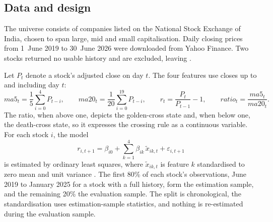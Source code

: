 \documentclass[11pt]{article}
\begin{document}
\subsection{Data and design}

The universe consists of \NUniverse{} companies listed on the National Stock
Exchange of India, chosen to span large, mid and small capitalisation. Daily closing
prices from 1~June 2019 to 30~June 2026 were downloaded from Yahoo Finance. Two
stocks returned no usable history and are excluded, leaving \NStocks.

Let $P_t$ denote a stock's adjusted close on day $t$. The four features use closes
up to and including day $t$:
\begin{equation}\label{eq:features}
  \mathit{ma5}_t = \frac{1}{5}\sum_{i=0}^{4} P_{t-i}, \qquad
  \mathit{ma20}_t = \frac{1}{20}\sum_{i=0}^{19} P_{t-i}, \qquad
  r_t = \frac{P_t}{P_{t-1}} - 1, \qquad
  \mathit{ratio}_t = \frac{\mathit{ma5}_t}{\mathit{ma20}_t}.
\end{equation}
The ratio, when above one, depicts the golden-cross state and, when below one, the death-cross
state, so it expresses the crossing rule as a continuous variable. For each stock
$i$, the model
\begin{equation}\label{eq:model}
  r_{i,t+1} = \beta_{i0} + \sum_{k=1}^{4} \beta_{ik}\, \tilde x_{ik,t} + \varepsilon_{i,t+1}
\end{equation}
is estimated by ordinary least squares, where $\tilde x_{ik,t}$ is feature $k$
standardised to zero mean and unit variance \citep{pedregosa2011}. The first 80\%
of each stock's observations, June 2019 to January 2025 for a stock with a full
history, form the estimation sample, and the remaining 20\% the evaluation sample.
The split is chronological, the standardisation uses estimation-sample statistics, 
and nothing is re-estimated during the evaluation sample.
\end{document}
